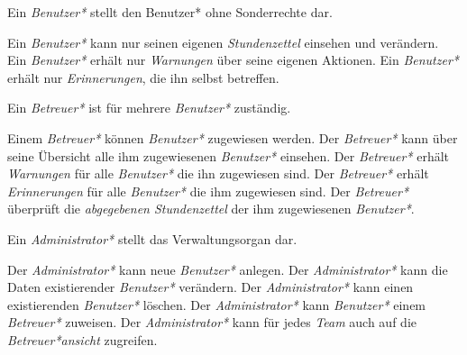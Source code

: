 \begin{requirements}
    Ein \emph{Benutzer*} stellt den Benutzer* ohne Sonderrechte dar.
    \begin{requirements}
         Ein \emph{Benutzer*} kann nur seinen eigenen \emph{Stundenzettel} einsehen und verändern.
         Ein \emph{Benutzer*} erhält nur \emph{Warnungen} über seine eigenen Aktionen.
         Ein \emph{Benutzer*} erhält nur \emph{Erinnerungen}, die ihn selbst betreffen.
    \end{requirements}

        Ein \emph{Betreuer*} ist für mehrere \emph{Benutzer*} zuständig.
        \begin{requirements}
             Einem \emph{Betreuer*} können \emph{Benutzer*} zugewiesen werden.
             Der \emph{Betreuer*} kann über seine Übersicht alle ihm zugewiesenen \emph{Benutzer*} einsehen.
             Der \emph{Betreuer*} erhält \emph{Warnungen} für alle \emph{Benutzer*} die ihn zugewiesen sind.
             Der \emph{Betreuer*} erhält \emph{Erinnerungen} für alle \emph{Benutzer*} die ihm zugewiesen sind.
             Der \emph{Betreuer*} überprüft die \emph{abgegebenen Stundenzettel} der ihm zugewiesenen \emph{Benutzer*}.
        \end{requirements}

        Ein \emph{Administrator*} stellt das Verwaltungsorgan dar.
        \begin{requirements}
             Der \emph{Administrator*} kann neue \emph{Benutzer*} anlegen.
             Der \emph{Administrator*} kann die Daten existierender \emph{Benutzer*} verändern.
             Der \emph{Administrator*} kann einen existierenden \emph{Benutzer*} löschen.
             Der \emph{Administrator*} kann \emph{Benutzer*} einem \emph{Betreuer*} zuweisen.
             Der \emph{Administrator*} kann für jedes \emph{Team} auch auf die \emph{Betreuer*ansicht} zugreifen.
        \end{requirements}
\end{requirements}

